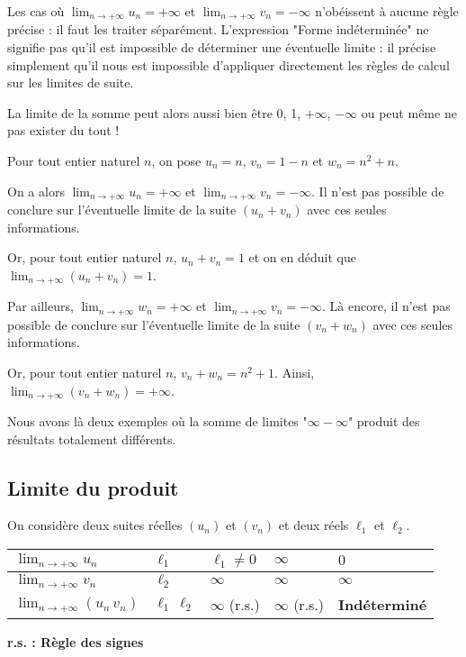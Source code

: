 \documentclass[11pt,fleqn]{book} %
\begin{document}
Les cas où $\displaystyle \lim_{n \to +\infty} u_n = +\infty$ et $\displaystyle \lim_{n \to +\infty} v_n = -\infty$ n'obéissent à aucune règle précise : il faut les traiter séparément. L'expression "Forme indéterminée" ne signifie pas qu'il est impossible de déterminer une éventuelle limite : il précise simplement qu'il nous est impossible d'appliquer directement les règles de calcul sur les limites de suite. 

La limite de la somme peut alors aussi bien être 0, 1, $+\infty$, $-\infty$ ou peut même ne pas exister du tout !

\begin{example} Pour tout entier naturel $n$, on pose $u_n = n$, $v_n = 1-n$ et $w_n=n^2+n$.

On a alors $\displaystyle \lim_{n \to +\infty} u_n = +\infty$ et $\displaystyle \lim_{n \to +\infty} v_n = -\infty$. Il n'est pas possible de conclure sur l'éventuelle limite de la suite $(u_n+v_n)$ avec ces seules informations.

Or, pour tout entier naturel $n$, $u_n+v_n=1$ et on en déduit que $\displaystyle \lim_{n \to +\infty} (u_n+v_n) = 1$.

Par ailleurs, $\displaystyle \lim_{n \to +\infty} w_n = +\infty$ et $\displaystyle \lim_{n \to +\infty} v_n = -\infty$. Là encore, il n'est pas possible de conclure sur l'éventuelle limite de la suite $(v_n+w_n)$ avec ces seules informations.

Or, pour tout entier naturel $n$, $v_n+w_n=n^2+1$. Ainsi, $\displaystyle \lim_{n \to +\infty} (v_n+w_n) = +\infty$. 

Nous avons là deux exemples où la somme de limites "$\infty - \infty $" produit des résultats totalement différents.\end{example}

\newpage

\subsection{Limite du produit}



\begin{proposition}On considère deux suites réelles $(u_n)$ et $(v_n)$ et deux réels $\ell_1$ et $\ell_2$. 
\vskip10pt
\begin{tabularx}{\linewidth}{|l|X|X|X|X|}
\hline
$\displaystyle \lim_{n \to +\infty} u_n$ & $\ell_1 $ & $\ell_1 \neq 0$ &  $\infty$ & $0$ \\
\hline
$\displaystyle \lim_{n \to +\infty} v_n$ & $\ell_2$ & $\infty$  & $\infty$  & $\infty$ \\
\hline
$\displaystyle \lim_{n \to +\infty} (u_n \, v_n)$ & $\ell_1\,\ell_2$ & $\infty$ (r.s.)  & $\infty$ (r.s.) & \textbf{Indéterminé} \\
\hline
\end{tabularx}

\begin{center}
 \textbf{r.s. : Règle des signes}
 \end{center} \vspace{-1cm} \end{proposition}
\end{document}
